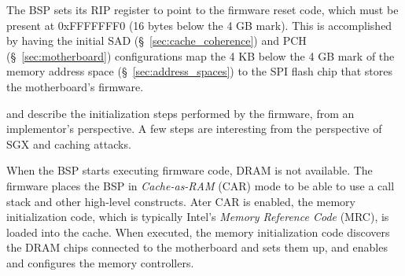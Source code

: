 The BSP sets its RIP register to point to the firmware reset code, which must
be present at 0xFFFFFFF0 (16 bytes below the 4 GB mark). This is accomplished
by having the initial SAD (\S~\ref{sec:cache_coherence}) and PCH
(\S~\ref{sec:motherboard}) configurations map the 4 KB below the 4 GB mark of
the memory address space (\S~\ref{sec:address_spaces}) to the SPI flash chip
that stores the motherboard's firmware.

\cite{intel2010booting} and \cite{coreboot2015manual} describe the
initialization steps performed by the firmware, from an implementor's
perspective. A few steps are interesting from the perspective of SGX and
caching attacks.


When the BSP starts executing firmware code, DRAM is not available. The
firmware places the BSP in \textit{Cache-as-RAM} (CAR) mode to be able to use a
call stack and other high-level constructs. Ater CAR is enabled, the memory
initialization code, which is typically Intel's \textit{Memory Reference Code}
(MRC), is loaded into the cache. When executed, the memory initialization code
discovers the DRAM chips connected to the motherboard and sets them up, and
enables and configures the memory controllers.


